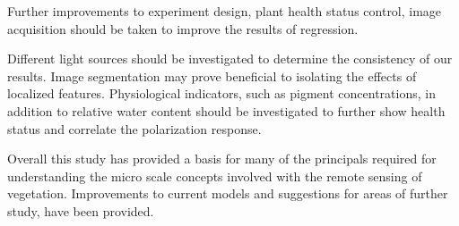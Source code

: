 Further improvements to experiment design, plant health status control, image acquisition should be taken to improve the results of regression.

Different light sources should be investigated to determine the consistency of our results.  Image segmentation may prove beneficial to isolating the effects of localized features.  Physiological indicators, such as pigment concentrations, in addition to relative water content should be investigated to further show health status and correlate the polarization response.

Overall this study has provided a basis for many of the principals required for understanding the micro scale concepts involved with the remote sensing of vegetation. Improvements to current models and suggestions for areas of further study, have been provided.
